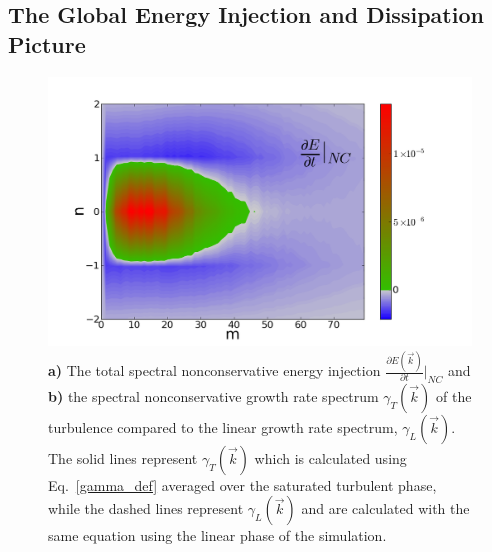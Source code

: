 \documentclass[showpacs,preprintnumbers,amsmath,amssymb,superscriptaddress,aip]{revtex4-1}
\newcommand{\pdiff}[2]{\frac{\partial#1}{\partial#2}}
\begin{document}
\subsection{The Global Energy Injection and Dissipation Picture}

\begin{figure}[!htbp]
\includegraphics[]{dEdt_nc}
\hfil
\caption{\textbf{a)} The total spectral nonconservative energy injection $\pdiff{E(\vec{k})}{t} \big|_{NC}$ and
\textbf{b)} the spectral nonconservative growth rate spectrum $\gamma_{T}(\vec{k})$ of the turbulence 
compared to the linear growth rate spectrum, $\gamma_L(\vec{k})$. 
The solid lines represent $\gamma_{T}(\vec{k})$ which is calculated using Eq.~\ref{gamma_def} averaged over the saturated turbulent phase, 
while the dashed lines represent $\gamma_L(\vec{k})$ and are calculated with the same equation using the linear phase of the simulation.}
\label{dEdt_tot_fig}
\end{figure}
\end{document}
